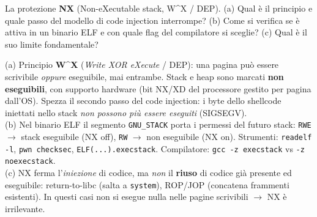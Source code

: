\question[6]
La protezione \textbf{NX} (Non-eXecutable stack, W\^{}X / DEP). (a) Qual è il principio e quale passo del modello di code injection interrompe? (b) Come si verifica se è attiva in un binario ELF e con quale flag del compilatore si sceglie? (c) Qual è il suo limite fondamentale?
\begin{solution}
(a) Principio \textbf{W\^{}X} (\emph{Write XOR eXecute} / DEP): una pagina può essere scrivibile \emph{oppure} eseguibile, mai entrambe. Stack e heap sono marcati \textbf{non eseguibili}, con supporto hardware (bit NX/XD del processore gestito per pagina dall'OS). Spezza il secondo passo del code injection: i byte dello shellcode iniettati nello stack \emph{non possono più essere eseguiti} (SIGSEGV).\\
(b) Nel binario ELF il segmento \lstinline|GNU_STACK| porta i permessi del futuro stack: \lstinline|RWE| $\to$ stack eseguibile (NX off), \lstinline|RW| $\to$ non eseguibile (NX on). Strumenti: \lstinline|readelf -l|, \lstinline|pwn checksec|, \lstinline|ELF(...).execstack|. Compilatore: \lstinline|gcc -z execstack| vs \lstinline|-z noexecstack|.\\
(c) NX ferma l'\emph{iniezione} di codice, ma \emph{non} il \textbf{riuso} di codice già presente ed eseguibile: return-to-libc (salta a \lstinline|system|), ROP/JOP (concatena frammenti esistenti). In questi casi non si esegue nulla nelle pagine scrivibili $\to$ NX è irrilevante.
\end{solution}
